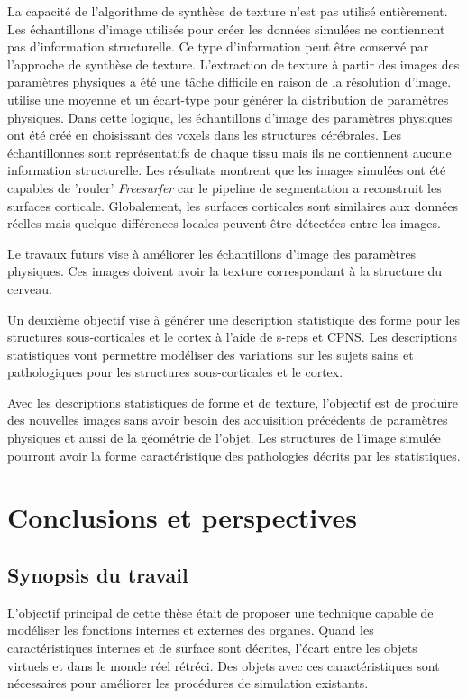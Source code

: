 La capacité de l'algorithme de synthèse de texture n'est pas utilisé entièrement. 
Les échantillons d'image utilisés pour créer les données simulées ne contiennent pas
d'information structurelle. Ce type d'information peut être conservé par l'approche de synthèse de texture.
L'extraction de texture à partir des images des paramètres physiques a été une tâche difficile en raison de la
résolution d'image.
\cite{CHAR-09} utilise une moyenne et un écart-type pour
générer la distribution de paramètres physiques.
Dans cette logique, les échantillons d'image des paramètres physiques ont été
créé en choisissant des voxels dans les structures cérébrales. Les échantillonnes sont représentatifs
de chaque tissu mais ils ne contiennent aucune information structurelle.
Les résultats montrent que 
les images simulées ont été capables de 'rouler' \textit{Freesurfer} car le pipeline de segmentation a 
reconstruit les surfaces corticale. Globalement, les surfaces corticales sont similaires aux données réelles
mais quelque différences locales peuvent être détectées entre les images.

Le travaux futurs vise à améliorer les échantillons d'image des paramètres physiques. 
Ces images doivent avoir la texture correspondant à la structure du cerveau.

Un deuxième objectif vise à générer une description statistique des forme
pour les structures sous-corticales et le cortex à l'aide de s-reps et CPNS.
Les descriptions statistiques vont permettre modéliser des variations sur les sujets sains et pathologiques
pour les structures sous-corticales et le cortex.

Avec les descriptions statistiques de forme et de texture, l'objectif est de 
produire des nouvelles images sans avoir besoin des acquisition précédents de paramètres physiques
et aussi de la géométrie de l'objet. 
Les structures de l'image simulée pourront avoir la forme caractéristique des pathologies décrits 
par les statistiques.

\section{Conclusions et perspectives}
\label{sec:conclusionsFr}

\subsection{Synopsis du travail}

L'objectif principal de cette thèse était de proposer une technique capable
de modéliser les fonctions internes et externes des organes.
Quand les caractéristiques internes et de surface sont décrites, 
l'écart entre les objets virtuels et dans le monde réel rétréci.
Des objets avec ces caractéristiques sont nécessaires pour améliorer les procédures de simulation existants.

